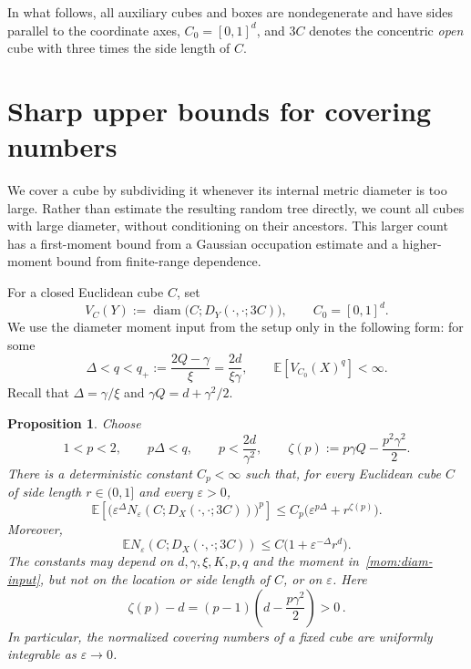 \documentclass[11pt,letterpaper]{article}
\newcommand{\E}{\mathbb E}
\newcommand{\eps}{\varepsilon}
\DeclareMathOperator{\diam}{diam}
\newtheorem{proposition}[theorem]{Proposition}
\theoremstyle{definition}
\theoremstyle{remark}
\numberwithin{equation}{section}
\begin{document}
In what follows, all auxiliary cubes and boxes are nondegenerate and have sides parallel to the coordinate axes, $C_0=[0,1]^d$, and $3C$ denotes the concentric \emph{open} cube with three times the side length of $C$.

\section{Sharp upper bounds for covering numbers}
\label{mom:sec}

We cover a cube by subdividing it whenever its internal metric diameter is too large. Rather than estimate the resulting random tree directly, we count all cubes with large diameter, without conditioning on their ancestors. This larger count has a first-moment bound from a Gaussian occupation estimate and a higher-moment bound from finite-range dependence.

For a closed Euclidean cube $C$, set
\begin{equation*}
 V_C(Y):=\diam\bigl(C;D_Y(\cdot,\cdot;3C)\bigr),
 \qquad C_0=[0,1]^d.
\end{equation*}
We use the diameter moment input from the setup only in the following form: for some
\begin{equation}\label{mom:diam-input}
 \Delta<q<q_+:=\frac{2Q-\gamma}{\xi}
                 =\frac{2d}{\xi\gamma},
 \qquad \E[V_{C_0}(X)^q]<\infty.
\end{equation}
Recall that $\Delta=\gamma/\xi$ and $\gamma Q=d+\gamma^2/2$.

\begin{proposition}\label{mom:main}
Choose
\begin{equation*}
 1<p<2,\qquad p\Delta<q,\qquad p<\frac{2d}{\gamma^2},
 \qquad
 \zeta(p):=p\gamma Q-\frac{p^2\gamma^2}{2}.
\end{equation*}
There is a deterministic constant $C_p<\infty$ such that, for every Euclidean cube $C$ of side length $r\in(0,1]$ and every $\eps>0$,
\begin{equation}\label{mom:cube-lp}
 \E\!\left[
   \bigl(\eps^\Delta
     N_\eps(C;D_X(\cdot,\cdot;3C))\bigr)^p
 \right]
 \le C_p\bigl(\eps^{p\Delta}+r^{\zeta(p)}\bigr).
\end{equation}
Moreover,
\begin{equation}\label{mom:cube-l1}
 \E N_\eps(C;D_X(\cdot,\cdot;3C))
 \le C\bigl(1+\eps^{-\Delta}r^d\bigr).
\end{equation}
The constants may depend on $d,\gamma,\xi,K,p,q$ and the moment in~\eqref{mom:diam-input}, but not on the location or side length of $C$, or on $\eps$. Here
\begin{equation*}
 \zeta(p)-d=(p-1)\left(d-\frac{p\gamma^2}{2}\right)>0\,.
\end{equation*}
In particular, the normalized covering numbers of a fixed cube are uniformly integrable as $\eps\to0$.
\end{proposition}
\end{document}
